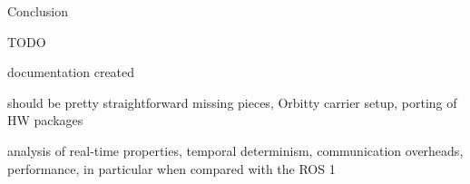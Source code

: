 \chap Conclusion

TODO

documentation created

should be pretty straightforward missing pieces, Orbitty carrier setup, porting of HW packages

analysis of real-time properties, temporal determinism, communication overheads, performance, in particular
when compared with the ROS 1
